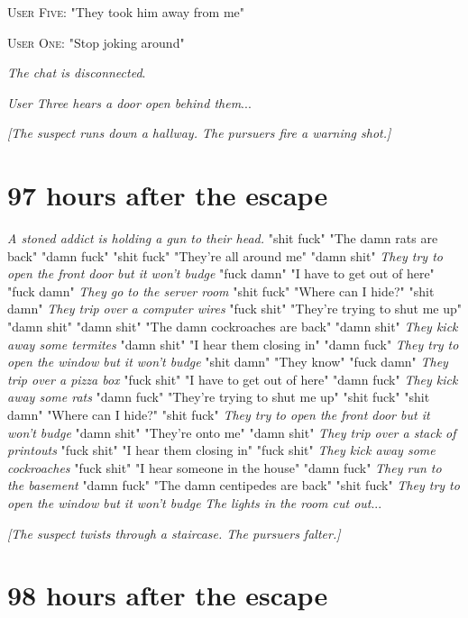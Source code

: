 \documentclass{report}
\begin{document}
\textsc{User Five}: "They took him away from me" 

\textsc{User One}: "Stop joking around" 

\textit{The chat is disconnected}. 

\textit{User Three hears a door open behind them}...

\textit{[The suspect runs down a hallway. The pursuers fire a warning shot.]}


\section*{97 \small{hours after the escape}}

\textit{A stoned addict is holding a gun to their head.} "shit fuck" "The damn rats are back" "damn fuck" \textit{} "shit fuck" "They're all around me" "damn shit" \textit{They try to open the front door but it won't budge} "fuck damn" "I have to get out of here" "fuck damn" \textit{They go to the server room} "shit fuck" "Where can I hide?" "shit damn" \textit{They trip over a computer wires} "fuck shit" "They're trying to shut me up" "damn shit" \textit{} "damn shit" "The damn cockroaches are back" "damn shit" \textit{They kick away some termites} "damn shit" "I hear them closing in" "damn fuck" \textit{They try to open the window but it won't budge} "shit damn" "They know" "fuck damn" \textit{They trip over a pizza box} "fuck shit" "I have to get out of here" "damn fuck" \textit{They kick away some rats} "damn fuck" "They're trying to shut me up" "shit fuck" \textit{} "shit damn" "Where can I hide?" "shit fuck" \textit{They try to open the front door but it won't budge} "damn shit" "They're onto me" "damn shit" \textit{They trip over a stack of printouts} "fuck shit" "I hear them closing in" "fuck shit" \textit{They kick away some cockroaches} "fuck shit" "I hear someone in the house" "damn fuck" \textit{They run to the basement} "damn fuck" "The damn centipedes are back" "shit fuck" \textit{They try to open the window but it won't budge} \textit{The lights in the room cut out}...

\textit{[The suspect twists through a staircase. The pursuers falter.]}


\section*{98 \small{hours after the escape}}
\end{document}
